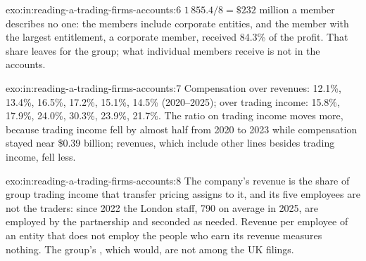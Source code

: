 \begin{solution}{exo:in:reading-a-trading-firms-accounts:6}
$1\,855.4/8=\$232$ million a member describes no one: the members include corporate entities, and the member with the
largest entitlement, a corporate member, received 84.3\% of the profit. That share leaves for the group; what individual
members receive is not in the accounts.
\end{solution}

\begin{solution}{exo:in:reading-a-trading-firms-accounts:7}
Compensation over revenues: 12.1\%, 13.4\%, 16.5\%, 17.2\%, 15.1\%, 14.5\% (2020--2025); over trading income: 15.8\%,
17.9\%, 24.0\%, 30.3\%, 23.9\%, 21.7\%. The ratio on trading income moves more, because trading income fell by almost
half from 2020 to 2023 while compensation stayed near \$0.39 billion; revenues, which include other
lines besides trading income, fell less.
\end{solution}

\begin{solution}{exo:in:reading-a-trading-firms-accounts:8}
The company's revenue is the share of group trading income that transfer pricing assigns to it, and its five employees
are not the traders: since 2022 the London staff, 790 on average in 2025, are employed by the partnership and seconded
as needed. Revenue per employee of an entity that does not employ the people who earn its revenue measures nothing.
The group's , which would, are not among the UK filings.
\end{solution}

